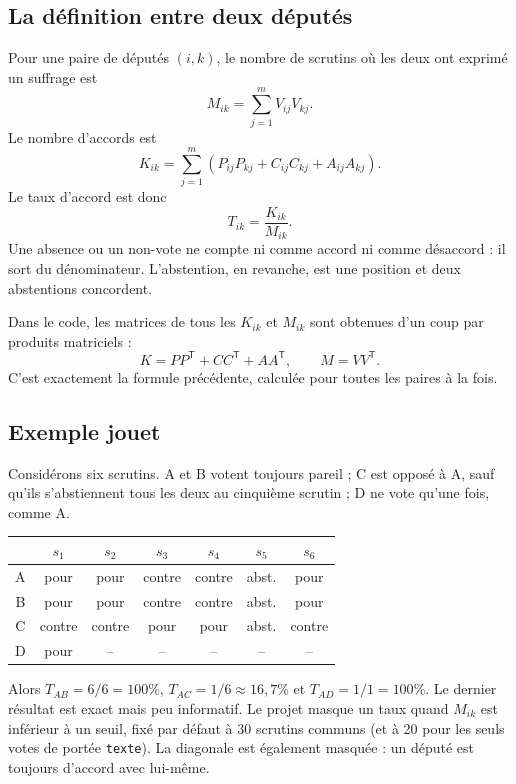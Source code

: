 \documentclass[11pt,a4paper]{article}
\newcommand{\code}[1]{\texttt{#1}}
\begin{document}
\subsection{La définition entre deux députés}

Pour une paire de députés $(i,k)$, le nombre de scrutins où les deux ont
exprimé un suffrage est
\[
 M_{ik}=\sum_{j=1}^{m}V_{ij}V_{kj}.
\]
Le nombre d'accords est
\[
 K_{ik}=\sum_{j=1}^{m}
 \left(P_{ij}P_{kj}+C_{ij}C_{kj}+A_{ij}A_{kj}\right).
\]
Le taux d'accord est donc
\[
 T_{ik}=\frac{K_{ik}}{M_{ik}}.
\]
Une absence ou un non-vote ne compte ni comme accord ni comme désaccord : il
sort du dénominateur. L'abstention, en revanche, est une position et deux
abstentions concordent.

Dans le code, les matrices de tous les $K_{ik}$ et $M_{ik}$ sont obtenues d'un
coup par produits matriciels :
\[
 K=PP^{\mathsf T}+CC^{\mathsf T}+AA^{\mathsf T},\qquad M=VV^{\mathsf T}.
\]
C'est exactement la formule précédente, calculée pour toutes les paires à la
fois.

\subsection{Exemple jouet}

Considérons six scrutins. A et B votent toujours pareil ; C est opposé à A,
sauf qu'ils s'abstiennent tous les deux au cinquième scrutin ; D ne vote qu'une
fois, comme A.

\begin{center}
\begin{tabular}{c*{6}{c}}
\toprule
 & $s_1$ & $s_2$ & $s_3$ & $s_4$ & $s_5$ & $s_6$ \\
\midrule
A & pour & pour & contre & contre & abst. & pour \\
B & pour & pour & contre & contre & abst. & pour \\
C & contre & contre & pour & pour & abst. & contre \\
D & pour & -- & -- & -- & -- & -- \\
\bottomrule
\end{tabular}
\end{center}

Alors $T_{AB}=6/6=100\%$, $T_{AC}=1/6\approx16{,}7\%$ et
$T_{AD}=1/1=100\%$. Le dernier résultat est exact mais peu informatif. Le
projet masque un taux quand $M_{ik}$ est inférieur à un seuil, fixé par défaut
à 30 scrutins communs (et à 20 pour les seuls votes de portée \code{texte}).
La diagonale est également masquée : un député est toujours d'accord avec lui-même.
\end{document}

